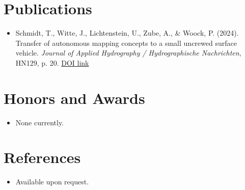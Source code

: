\documentclass[11pt,a4paper,sans]{moderncv}
\begin{document}

\section{Publications}
\vspace{1pt}
\begin{itemize}
\item Schmidt, T., Witte, J., Lichtenstein, U., Zube, A., \& Woock, P. (2024). Transfer of autonomous mapping concepts to a small uncrewed surface vehicle. \textit{Journal of Applied Hydrography / Hydrographische Nachrichten}, HN129, p. 20. \href{https://doi.org/10.23784/HN129-03}{DOI link}
\end{itemize}


\section{Honors and Awards}
\vspace{1pt}
\begin{itemize}
\item{None currently.}
\end{itemize}


\section{References}
\vspace{1pt}
\begin{itemize}
\item{Available upon request.}
\end{itemize}
\end{document}
